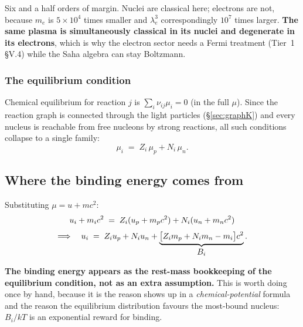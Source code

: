 Six and a half orders of margin. Nuclei are classical here; electrons are not,
because $m_e$ is $5\times10^{4}$ times smaller and $\lambda_e^3$ correspondingly
$10^{7}$ times larger. \textbf{The same plasma is simultaneously classical in
its nuclei and degenerate in its electrons}, which is why the electron sector
needs a Fermi treatment (Tier~1 \S V.4) while the Saha algebra can stay
Boltzmann.

\subsubsection{The equilibrium condition}
\label{sec:eqcondition}

Chemical equilibrium for reaction $j$ is $\sum_i \nu_{ij}\mu_i = 0$ (in the full
$\mu$). Since the reaction graph is connected through the light particles
(\S\ref{sec:graphK}) and every nucleus is reachable from free nucleons by strong
reactions, all such conditions collapse to a single family:
%
\begin{equation}
\mu_i \;=\; Z_i\,\mu_p + N_i\,\mu_n .
\label{eq:muchain}
\end{equation}

\subsection{Where the binding energy comes from}
\label{sec:binding}

Substituting $\mu = u + mc^2$:
%
\begin{equation}
u_i + m_ic^2 \;=\; Z_i(u_{p} + m_pc^2) + N_i(u_{n} + m_nc^2)
\label{eq:musub}
\end{equation}
%
\begin{equation}
\Longrightarrow\quad u_i \;=\; Z_i u_{p} + N_i u_{n} +
  \underbrace{\bigl[Z_i m_p + N_i m_n - m_i\bigr]c^2}_{\textstyle B_i}.
\label{eq:bindingappears}
\end{equation}

\begin{invariant}
\textbf{The binding energy appears as the rest-mass bookkeeping of the
equilibrium condition, not as an extra assumption.} This is worth doing once by
hand, because it is the reason  shows up in a
\emph{chemical-potential} formula and the reason the equilibrium distribution
favours the most-bound nucleus: $B_i/kT$ is an exponential reward for binding.
\end{invariant}

